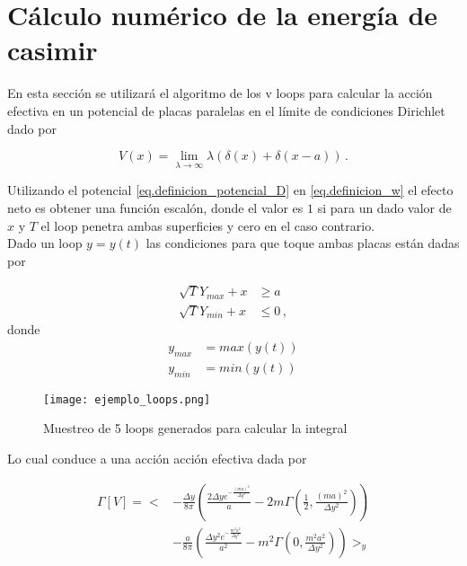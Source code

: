 \section{Cálculo numérico de la energía de casimir}


En esta sección se utilizará el algoritmo de los v loops para calcular la acción efectiva en un potencial de placas paralelas en el límite de condiciones Dirichlet dado por

\begin{equation}
V(x) = \lim _{\lambda \rightarrow \infty} \lambda \left( \delta (x) + \delta ( x - a) \right)
\, .
\label{eq.definicion_potencial_D}
\end{equation}

Utilizando el potencial \eqref{eq.definicion_potencial_D} en \eqref{eq.definicion_w} el efecto neto es obtener una función escalón, donde el valor es $1$ si para un dado valor de $x$ y $T$ el loop penetra ambas superficies y cero en el caso contrario. \\


Dado un loop $y = y(t)$ las condiciones para que toque ambas placas están dadas por

\begin{align}
\label{condiciones}
\sqrt{T} Y_{max} + x & \geq a \\
\sqrt{T} Y_{min} + x & \leq 0 \, ,
\nonumber
\end{align}
donde 
\begin{align*}
y_{max}  &= max(y(t)) \\
y_{min}  &= min(y(t)) \, 
\end{align*}




\begin{figure}
    \centering
    \texttt{[image: ejemplo\_loops.png]}
    \caption{Muestreo de 5 loops generados para calcular la integral}
    \label{fig:ejemplo_loops}
\end{figure}



Lo cual conduce a una acción acción efectiva dada por

\begin{align}
\label{ec1.accion_efectiva}
\Gamma \left[ V \right] = 
 \Bigg<
&- \frac{\Delta y}{8 \pi}
	\left(
		\frac{2 \Delta y e^{-\frac{(m a)^2}{\Delta y ^2}}}{a}
		-2 m \Gamma \left( \frac{1}{2}, \frac{(m a)^2}{\Delta y ^2} \right)
	\right) \\
	&-  \frac{a}{8 \pi}
	\left(
		\frac{\Delta y ^2 e^{-\frac{m^2 a^2}{\Delta y^2}}}{a^2} -
		m^2 \Gamma \left( 0, \frac{m^2 a^2}{\Delta y ^2} \right)
	\right)	
\Bigg> _{y} 
\nonumber
\end{align}

